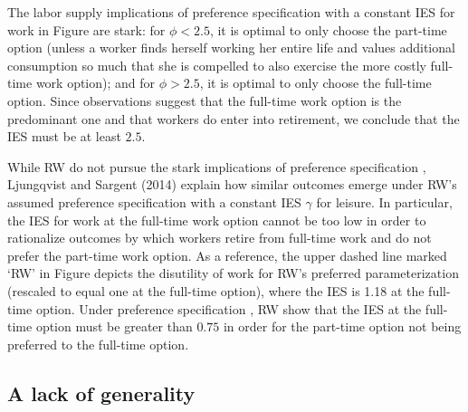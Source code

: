 The labor supply implications of preference specification  
with a constant IES for work in Figure  are stark: 
for $\phi < 2.5$, it is optimal to only choose the part-time option 
(unless a worker finds herself working her entire life and values
additional consumption so much that she is compelled to also exercise 
the more costly full-time work option); and for $\phi > 2.5$, it is 
optimal to only choose the full-time option. Since observations
suggest that the full-time work option is the predominant one and
that workers do enter into retirement, we conclude that the IES must 
be at least $2.5$.

While RW do not pursue the stark implications of preference 
specification , Ljungqvist and Sargent (2014) explain how
similar outcomes emerge under RW's assumed preference specification 
 with a constant IES $\gamma$ for leisure. 
In particular, the IES for work at the full-time work option cannot 
be too low in order to rationalize outcomes by which workers retire 
from full-time work and do not prefer the part-time work option. As a
reference, the upper dashed line marked `RW' in Figure 
depicts the disutility of work for RW's preferred parameterization
(rescaled to equal one at the full-time option),
where the IES is 1.18 at the full-time option.
Under preference specification ,
RW show that the IES at the full-time 
option must be greater than $0.75$ in order for the part-time 
option not being preferred to the full-time option.


\subsection{A lack of generality}

